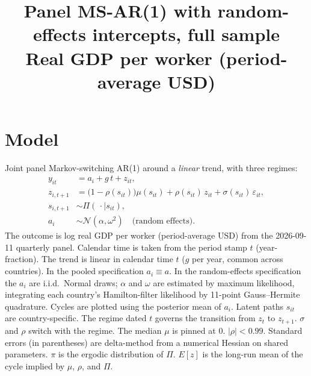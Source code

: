 \documentclass[11pt]{article}
\title{Panel MS-AR(1) with random-effects intercepts, full sample\\[0.4em]\large Real GDP per worker (period-average USD)}
\author{}
\date{}
\begin{document}
\maketitle
\section{Model}
Joint panel Markov-switching AR(1) around a \emph{linear} trend, with three regimes:
\begin{align}
y_{it} &= a_i + g\, t + z_{it}, \\
z_{i,t+1} &= \bigl(1-\rho(s_{it})\bigr)\mu(s_{it}) + \rho(s_{it})\, z_{it} + \sigma(s_{it})\,\varepsilon_{it}, \\
s_{i,t+1} &\sim \Pi(\,\cdot\mid s_{it}), \\
a_i &\sim \mathcal{N}(\alpha,\omega^2) \quad \text{(random effects)}.
\end{align}
The outcome is log real GDP per worker (period-average USD) from the 2026-09-11 quarterly panel. Calendar time is taken from the period stamp $t$ (year-fraction). The trend is linear in calendar time $t$ ($g$ per year, common across countries). In the pooled specification $a_i\equiv a$. In the random-effects specification the $a_i$ are i.i.d.\ Normal draws; $\alpha$ and $\omega$ are estimated by maximum likelihood, integrating each country's Hamilton-filter likelihood by 11-point Gauss--Hermite quadrature. Cycles are plotted using the posterior mean of $a_i$. Latent paths $s_{it}$ are country-specific. The regime dated $t$ governs the transition from $z_t$ to $z_{t+1}$. $\sigma$ and $\rho$ switch with the regime. The median $\mu$ is pinned at 0. $|\rho|<0.99$.
Standard errors (in parentheses) are delta-method from a numerical Hessian on shared parameters. $\pi$ is the ergodic distribution of $\Pi$. $E[z]$ is the long-run mean of the cycle implied by $\mu$, $\rho$, and $\Pi$.
\clearpage
\end{document}
